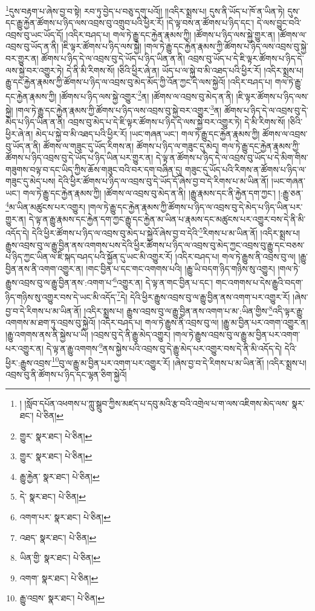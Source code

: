\footnote{། །སློབ་དཔོན་འཕགས་པ་ཀླུ་སྒྲུབ་ཀྱིས་མཛད་པ་དབུ་མའི་རྩ་བའི་འགྲེལ་པ་ག་ལས་འཇིགས་མེད་ལས་  སྣར་ཐང་།  པེ་ཅིན། }དུས་བརྟག་པ་ཞེས་བྱ་བ་སྟེ། རབ་ཏུ་བྱེད་པ་བཅུ་དགུ་པའོ།། །།འདིར་སྨྲས་པ། དུས་ནི་ཡོད་པ་ཁོ་ན་ཡིན་ཏེ། དུས་དང་རྒྱུ་རྐྱེན་ཚོགས་པ་ཉིད་ལས་འབྲས་བུ་འགྲུབ་པའི་ཕྱིར་རོ། །དེ་ལྟ་བས་ན་ཚོགས་པ་ཉིད་དང་། དེ་ལས་བྱུང་བའི་འབྲས་བུ་ཡང་ཡོད་དོ། །འདིར་བཤད་པ། གལ་ཏེ་རྒྱུ་དང་རྐྱེན་རྣམས་ཀྱི། །ཚོགས་པ་ཉིད་ལས་སྐྱེ་གྱུར་ན། །ཚོགས་ལ་འབྲས་བུ་ཡོད་ན་ནི། །ཇི་ལྟར་ཚོགས་པ་ཉིད་ལས་སྐྱེ། །གལ་ཏེ་རྒྱུ་དང་རྐྱེན་རྣམས་ཀྱི་ཚོགས་པ་ཉིད་ལས་འབྲས་བུ་སྐྱེ་བར་གྱུར་ན། ཚོགས་པ་ཉིད་དེ་ལ་འབྲས་བུ་དེ་ཡོད་པ་ཉིད་ཡིན་ན་ནི། འབྲས་བུ་ཡོད་པ་དེ་ཇི་ལྟར་ཚོགས་པ་ཉིད་དེ་ལས་སྐྱེ་བར་འགྱུར་ཏེ། དེ་ནི་མི་རིགས་སོ། །ཅིའི་ཕྱིར་ཞེ་ན། ཡོད་པ་ལ་སྐྱེ་བ་མི་འཐད་པའི་ཕྱིར་རོ། །འདིར་སྨྲས་པ། རྒྱུ་དང་རྐྱེན་རྣམས་ཀྱི་ཚོགས་པ་ཉིད་ལ་འབྲས་བུ་མེད་མོད་ཀྱི་འོན་ཀྱང་དེ་ལས་སྐྱེའོ། །འདིར་བཤད་པ། གལ་ཏེ་རྒྱུ་དང་རྐྱེན་རྣམས་ཀྱི། །ཚོགས་པ་ཉིད་ལས་སྐྱེ་འགྱུར་\footnote{གྱུར་  སྣར་ཐང་།  པེ་ཅིན། }ན། །ཚོགས་ལ་འབྲས་བུ་མེད་ན་ནི། །ཇི་ལྟར་ཚོགས་པ་ཉིད་ལས་སྐྱེ། །གལ་ཏེ་རྒྱུ་དང་རྐྱེན་རྣམས་ཀྱི་ཚོགས་པ་ཉིད་ལས་འབྲས་བུ་སྐྱེ་བར་འགྱུར་\footnote{གྱུར་  སྣར་ཐང་།  པེ་ཅིན། }ན། ཚོགས་པ་ཉིད་དེ་ལ་འབྲས་བུ་དེ་མེད་པ་ཉིད་ཡིན་ན་ནི། འབྲས་བུ་མེད་པ་དེ་ཇི་ལྟར་ཚོགས་པ་ཉིད་དེ་ལས་སྐྱེ་བར་འགྱུར་ཏེ། དེ་མི་རིགས་སོ། །ཅིའི་ཕྱིར་ཞེ་ན། མེད་པ་སྐྱེ་བ་མི་འཐད་པའི་ཕྱིར་རོ། །ཡང་གཞན་ཡང་། གལ་ཏེ་རྒྱུ་དང་རྐྱེན་རྣམས་ཀྱི། ཚོགས་ལ་འབྲས་བུ་ཡོད་ན་ནི། ཚོགས་ལ་གཟུང་དུ་ཡོད་རིགས་ན། ཚོགས་པ་ཉིད་ལ་གཟུང་དུ་མེད། གལ་ཏེ་རྒྱུ་དང་རྐྱེན་རྣམས་ཀྱི་ཚོགས་པ་ཉིད་འབྲས་བུ་དེ་ཡོད་པ་ཉིད་ཡིན་པར་གྱུར་ན། དེ་ལྟ་ན་ཚོགས་པ་ཉིད་དེ་ལ་འབྲས་བུ་ཡོད་པ་དེ་མིག་གིས་གཟུགས་བལྟ་བ་དང་ཡིད་ཀྱིས་ཆོས་གཟུང་བའི་བར་དག་བཞིན་དུ། གཟུང་དུ་ཡོད་པའི་རིགས་ན་ཚོགས་པ་ཉིད་ལ་གཟུང་དུ་མེད་པས། དེའི་ཕྱིར་ཚོགས་པ་ཉིད་ལ་འབྲས་བུ་དེ་ཡོད་དོ་ཞེས་བྱ་བ་དེ་རིགས་པ་མ་ཡིན་ནོ། །ཡང་གཞན་ཡང་། གལ་ཏེ་རྒྱུ་དང་རྐྱེན་རྣམས་ཀྱི། །ཚོགས་ལ་འབྲས་བུ་མེད་ན་ནི། །རྒྱུ་རྣམས་དང་ནི་རྐྱེན་དག་ཀྱང་། །:རྒྱུ་ཅན་\footnote{རྒྱུ་རྐྱེན་  སྣར་ཐང་།  པེ་ཅིན། }མ་ཡིན་མཚུངས་པར་འགྱུར། །གལ་ཏེ་རྒྱུ་དང་རྐྱེན་རྣམས་ཀྱི་ཚོགས་པ་ཉིད་ལ་འབྲས་བུ་དེ་མེད་པ་ཉིད་ཡིན་པར་གྱུར་ན། དེ་ལྟ་ན་རྒྱུ་རྣམས་དང་རྐྱེན་དག་ཀྱང་རྒྱུ་དང་རྐྱེན་མ་ཡིན་པ་རྣམས་དང་མཚུངས་པར་འགྱུར་བས་དེ་ནི་མི་འདོད་དེ། དེའི་ཕྱིར་ཚོགས་པ་ཉིད་ལ་འབྲས་བུ་མེད་པ་སྐྱེའོ་ཞེས་བྱ་བ་དེའི་\footnote{དེ་  སྣར་ཐང་།  པེ་ཅིན། }རིགས་པ་མ་ཡིན་ནོ། །འདིར་སྨྲས་པ། རྒྱུས་འབྲས་བུ་ལ་རྒྱུ་བྱིན་ནས་འགགས་པས་དེའི་ཕྱིར་ཚོགས་པ་ཉིད་ལ་འབྲས་བུ་མེད་ཀྱང་འབྲས་བུ་རྒྱུ་དང་བཅས་པ་ཉིད་ཀྱང་ཡིན་ལ་ཇི་སྐད་བཤད་པའི་སྐྱོན་དུ་ཡང་མི་འགྱུར་རོ། །འདིར་བཤད་པ། གལ་ཏེ་རྒྱུས་ནི་འབྲས་བུ་ལ། །རྒྱུ་བྱིན་ནས་ནི་འགག་འགྱུར་ན། །གང་བྱིན་པ་དང་གང་འགགས་པའི། །རྒྱུ་ཡི་བདག་ཉིད་གཉིས་སུ་འགྱུར། །གལ་ཏེ་རྒྱུས་འབྲས་བུ་ལ་རྒྱུ་བྱིན་ནས་:འགག་པ་\footnote{འགག་པར་  སྣར་ཐང་།  པེ་ཅིན། }འགྱུར་ན། དེ་ལྟ་ན་གང་བྱིན་པ་དང་། གང་འགགས་པ་དེས་རྒྱུའི་བདག་ཉིད་གཉིས་སུ་འགྱུར་བས་དེ་ཡང་མི་འདོད་\footnote{འཐད་  སྣར་ཐང་།  པེ་ཅིན། }དེ། དེའི་ཕྱིར་རྒྱུས་འབྲས་བུ་ལ་རྒྱུ་བྱིན་ནས་འགག་པར་འགྱུར་རོ། །ཞེས་བྱ་བ་དེ་རིགས་པ་མ་ཡིན་ནོ། །འདིར་སྨྲས་པ། རྒྱུས་འབྲས་བུ་ལ་རྒྱུ་བྱིན་ནས་འགག་པ་མ་:ཡིན་གྱིས་\footnote{ཡིན་གྱི་  སྣར་ཐང་།  པེ་ཅིན། }འདི་ལྟར་རྒྱུ་འགགས་མ་ཐག་ཏུ་འབྲས་བུ་སྐྱེའོ། །འདིར་བཤད་པ། གལ་ཏེ་རྒྱུས་ནི་འབྲས་བུ་ལ། །རྒྱུ་མ་བྱིན་པར་འགག་འགྱུར་ན། །རྒྱུ་འགགས་ནས་ནི་སྐྱེས་པ་ཡི། །འབྲས་བུ་དེ་ནི་རྒྱུ་མེད་འགྱུར། །གལ་ཏེ་རྒྱུས་འབྲས་བུ་ལ་རྒྱུ་མ་བྱིན་པར་འགག་པར་འགྱུར་ན། དེ་ལྟ་ན་རྒྱུ་འགགས་\footnote{འགག་  སྣར་ཐང་།  པེ་ཅིན། }ནས་སྐྱེས་པའི་འབྲས་བུ་དེ་རྒྱུ་མེད་པར་འགྱུར་བས་དེ་ནི་མི་འདོད་དེ། དེའི་ཕྱིར་:རྒྱུས་འབྲས་\footnote{རྒྱུ་འབྲས་  སྣར་ཐང་།  པེ་ཅིན། }བུ་ལ་རྒྱུ་མ་བྱིན་པར་འགག་པར་འགྱུར་རོ། །ཞེས་བྱ་བ་དེ་རིགས་པ་མ་ཡིན་ནོ། །འདིར་སྨྲས་པ། འབྲས་བུ་ནི་ཚོགས་པ་ཉིད་དང་ལྷན་ཅིག་སྐྱེའོ། 